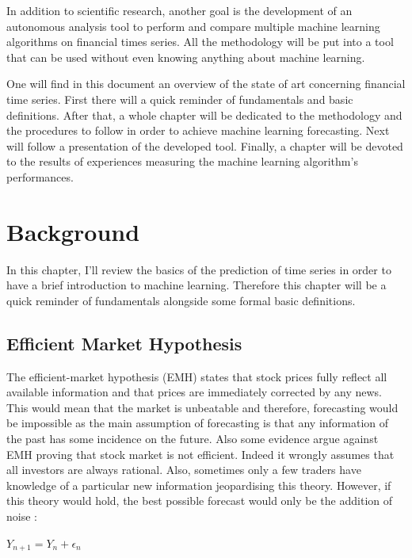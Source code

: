 \documentclass[11pt,a4paper,oneside]{book}
\begin{document}
In addition to scientific research, another goal is the development of an autonomous analysis tool to perform and compare multiple machine learning algorithms on financial times series. All the methodology will be put into a tool that can be used without even knowing anything about machine learning.

One will find in this document an overview of the state of art concerning financial time series. First there will a quick reminder of fundamentals and basic definitions. After that, a whole chapter will be dedicated to the methodology and the procedures to follow in order to achieve machine learning forecasting. Next will follow a presentation of the developed tool. Finally, a chapter will be devoted to the results of experiences measuring the machine learning algorithm's performances.




\chapter{Background}

In this chapter, I'll review the basics of the prediction of time series in order to have a brief introduction to machine learning. Therefore this chapter will be a quick reminder of fundamentals alongside some formal basic definitions. 



\section{Efficient Market Hypothesis}

The efficient-market hypothesis (EMH) states that stock prices fully reflect all available information and that prices are immediately corrected by any news. This would mean that the market is unbeatable and therefore, forecasting would be impossible as the main assumption of forecasting is that any information of the past has some incidence on the future. Also some evidence argue against EMH proving that stock market is not efficient. Indeed it wrongly assumes that all investors are always rational. Also, sometimes only a few traders have knowledge of a particular new information jeopardising this theory. However, if this theory would hold, the best possible forecast would only be the addition of noise \cite{aamodt} : 

\begin{center}
    $Y_{n+1} = Y_{n} + \epsilon_{n}$
\end{center}
\end{document}
